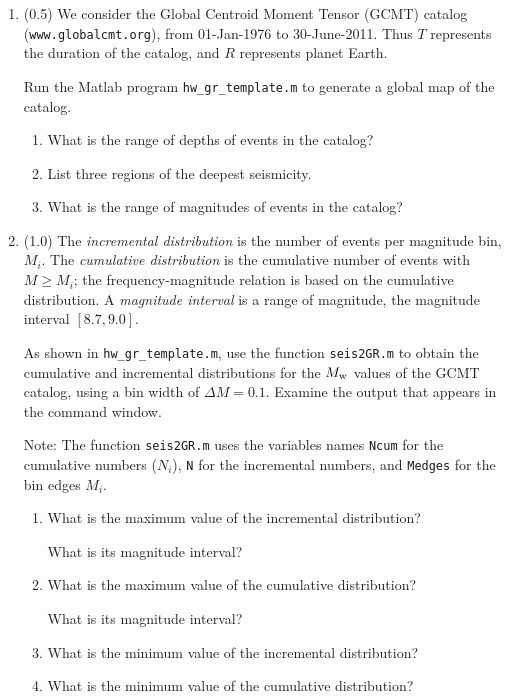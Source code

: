 \documentclass[11pt,titlepage,fleqn]{article}
\begin{document}
\begin{enumerate}
\item (0.5) We consider the Global Centroid Moment Tensor (GCMT) catalog (\verb+www.globalcmt.org+), from 01-Jan-1976 to 30-June-2011. Thus $T$ represents the duration of the catalog, and $R$ represents planet Earth.

Run the Matlab program \verb+hw_gr_template.m+ to generate a global map of the catalog.
%
\begin{enumerate}
\item What is the range of depths of events in the catalog?
\item List three regions of the deepest seismicity.
\item What is the range of magnitudes of events in the catalog?
\end{enumerate}

\item (1.0) The {\em incremental distribution} is the number of events per magnitude bin, $M_i$. The {\em cumulative distribution} is the cumulative number of events with $M \ge M_i$; the frequency-magnitude relation is based on the cumulative distribution. A {\em magnitude interval} is a range of magnitude, \eg the magnitude interval $[8.7,9.0]$.

As shown in \verb+hw_gr_template.m+, use the function \verb+seis2GR.m+ to obtain the cumulative and incremental distributions for the $M_{\rm w}$ values of the GCMT catalog, using a bin width of $\Delta M = 0.1$. Examine the output that appears in the command window.

Note: The function \verb+seis2GR.m+ uses the variables names \verb+Ncum+ for the cumulative numbers ($N_i$), \verb+N+ for the incremental numbers, and \verb+Medges+ for the bin edges $M_i$.

\begin{enumerate}
\item What is the maximum value of the incremental distribution?

What is its magnitude interval?

\item What is the maximum value of the cumulative distribution?

What is its magnitude interval?

\item What is the minimum value of the incremental distribution? 

\item What is the minimum value of the cumulative distribution? 
\end{enumerate}


\end{enumerate}
\end{document}

